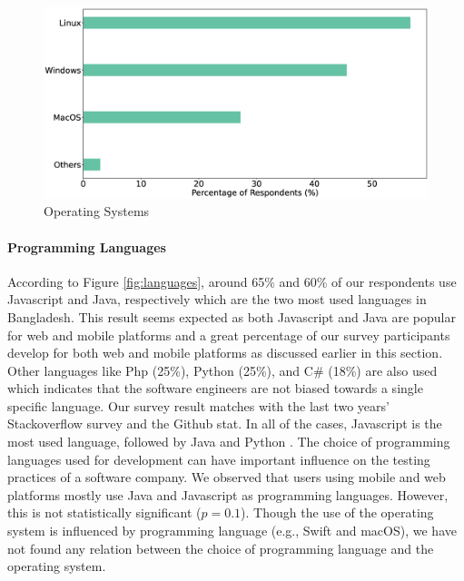 \begin{figure}[h]
\centering
  \includegraphics[scale=0.17]{Figures/Respondents_os}
  \caption{Operating Systems}
  \label{fig:os}
\end{figure}


\paragraph{Programming Languages}
According to Figure \ref{fig:languages}, around 65\% and 60\% of our respondents use Javascript and Java, respectively which are the two most used languages in Bangladesh. This result seems expected as both Javascript and Java are popular for web and mobile platforms and a great percentage of our survey participants develop for both web and mobile platforms as discussed earlier in this section. Other languages like Php (25\%), Python (25\%), and C\# (18\%) are also used which indicates that the software engineers are not biased towards a single specific language. Our survey result matches with the last two years' Stackoverflow survey and the Github stat. In all of the cases, Javascript is the most used language, followed by Java and Python \cite{StackoverflowSurvey2020, StackoverflowSurvey2019, GithubStat}. The choice of programming languages used for development can have important influence on the testing practices of a software company. We observed that users using mobile and web platforms mostly use Java and Javascript as programming languages. However, this is not statistically significant ($p=0.1$). Though the use of the operating system is influenced by programming language (e.g., Swift and macOS), we have not found any relation between the choice of programming language and the operating system.

